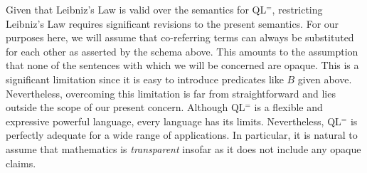 Given that Leibniz's Law is valid over the semantics for QL$^=$, restricting Leibniz's Law requires significant revisions to the present semantics.
For our purposes here, we will assume that co-referring terms can always be substituted for each other as asserted by the schema above.
This amounts to the assumption that none of the sentences with which we will be concerned are opaque.
This is a significant limitation since it is easy to introduce predicates like $B$ given above. 
Nevertheless, overcoming this limitation is far from straightforward and lies outside the scope of our present concern.
Although QL$^=$ is a flexible and expressive powerful language, every language has its limits.
Nevertheless, QL$^=$ is perfectly adequate for a wide range of applications. 
In particular, it is natural to assume that mathematics is \textit{transparent} insofar as it does not include any opaque claims.









\iffalse

\practiceproblems

